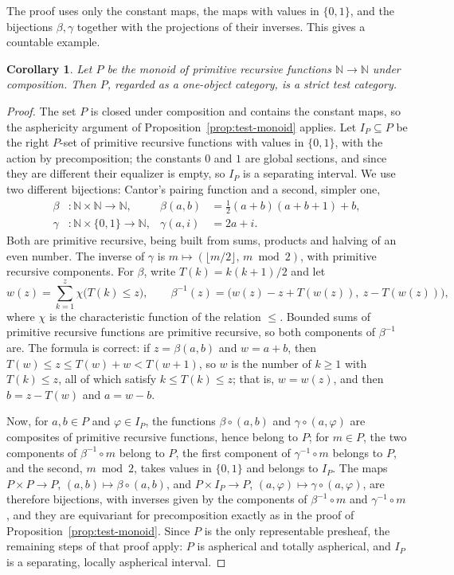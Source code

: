 \documentclass[11pt]{amsart}
\newtheorem{corollary}[teo]{Corollary}
\theoremstyle{definition}
\theoremstyle{remark}
\numberwithin{figure}{section}%
\begin{document}
The proof uses only the constant maps, the maps with values in $\{0,1\}$, and the bijections $\beta,\gamma$ together with the projections of their inverses. This gives a countable example.

\begin{corollary}\label{cor:test-monoid-pr}
Let $P$ be the monoid of primitive recursive functions $\mathbb N\to\mathbb N$ under composition. Then $P$, regarded as a one-object category, is a strict test category.
\end{corollary}

\begin{proof}
The set $P$ is closed under composition and contains the constant maps, so the asphericity argument of Proposition~\ref{prop:test-monoid} applies. Let $I_P\subseteq P$ be the right $P$-set of primitive recursive functions with values in $\{0,1\}$, with the action by precomposition; the constants $0$ and $1$ are global sections, and since they are different their equalizer is empty, so $I_P$ is a separating interval. We use two different bijections: Cantor's pairing function and a second, simpler one,
\[
\begin{aligned}
\beta&\colon\mathbb N\times\mathbb N\to\mathbb N, & \beta(a,b)&=\tfrac12(a+b)(a+b+1)+b,\\
\gamma&\colon\mathbb N\times\{0,1\}\to\mathbb N, & \gamma(a,i)&=2a+i.
\end{aligned}
\]
Both are primitive recursive, being built from sums, products and halving of an even number. The inverse of $\gamma$ is $m\mapsto(\lfloor m/2\rfloor,\,m\bmod 2)$, with primitive recursive components. For $\beta$, write $T(k)=k(k+1)/2$ and let
\[
w(z)=\sum_{k=1}^{z}\chi\big(T(k)\leq z\big),\qquad \beta^{-1}(z)=\big(w(z)-z+T(w(z)),\ z-T(w(z))\big),
\]
where $\chi$ is the characteristic function of the relation $\leq$. Bounded sums of primitive recursive functions are primitive recursive, so both components of $\beta^{-1}$ are. The formula is correct: if $z=\beta(a,b)$ and $w=a+b$, then $T(w)\leq z\leq T(w)+w<T(w+1)$, so $w$ is the number of $k\geq1$ with $T(k)\leq z$, all of which satisfy $k\leq T(k)\leq z$; that is, $w=w(z)$, and then $b=z-T(w)$ and $a=w-b$.

Now, for $a,b\in P$ and $\varphi\in I_P$, the functions $\beta\circ(a,b)$ and $\gamma\circ(a,\varphi)$ are composites of primitive recursive functions, hence belong to $P$; for $m\in P$, the two components of $\beta^{-1}\circ m$ belong to $P$, the first component of $\gamma^{-1}\circ m$ belongs to $P$, and the second, $m\bmod 2$, takes values in $\{0,1\}$ and belongs to $I_P$. The maps $P\times P\to P$, $(a,b)\mapsto\beta\circ(a,b)$, and $P\times I_P\to P$, $(a,\varphi)\mapsto\gamma\circ(a,\varphi)$, are therefore bijections, with inverses given by the components of $\beta^{-1}\circ m$ and $\gamma^{-1}\circ m$, and they are equivariant for precomposition exactly as in the proof of Proposition~\ref{prop:test-monoid}. Since $P$ is the only representable presheaf, the remaining steps of that proof apply: $P$ is aspherical and totally aspherical, and $I_P$ is a separating, locally aspherical interval.
\end{proof}
\end{document}
